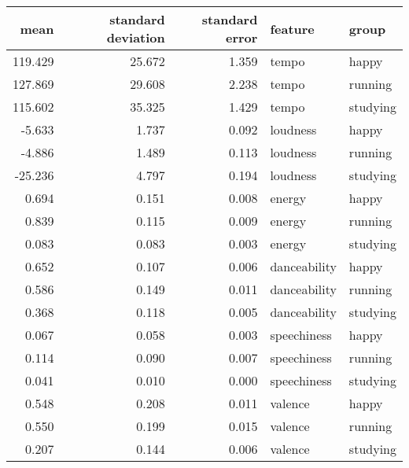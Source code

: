 \begin{tabular}{rrrll}
\toprule
    mean &  standard deviation &  standard error &       feature &     group \\
\midrule
 119.429 &              25.672 &           1.359 &         tempo &     happy \\
 127.869 &              29.608 &           2.238 &         tempo &   running \\
 115.602 &              35.325 &           1.429 &         tempo &  studying \\
  -5.633 &               1.737 &           0.092 &      loudness &     happy \\
  -4.886 &               1.489 &           0.113 &      loudness &   running \\
 -25.236 &               4.797 &           0.194 &      loudness &  studying \\
   0.694 &               0.151 &           0.008 &        energy &     happy \\
   0.839 &               0.115 &           0.009 &        energy &   running \\
   0.083 &               0.083 &           0.003 &        energy &  studying \\
   0.652 &               0.107 &           0.006 &  danceability &     happy \\
   0.586 &               0.149 &           0.011 &  danceability &   running \\
   0.368 &               0.118 &           0.005 &  danceability &  studying \\
   0.067 &               0.058 &           0.003 &   speechiness &     happy \\
   0.114 &               0.090 &           0.007 &   speechiness &   running \\
   0.041 &               0.010 &           0.000 &   speechiness &  studying \\
   0.548 &               0.208 &           0.011 &       valence &     happy \\
   0.550 &               0.199 &           0.015 &       valence &   running \\
   0.207 &               0.144 &           0.006 &       valence &  studying \\
\bottomrule
\end{tabular}
